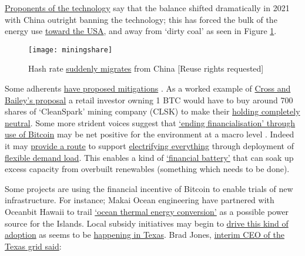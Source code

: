 \href{https://electricmoney.org/}{Proponents of the technology} say that the balance shifted dramatically in 2021 with China outright banning the technology; this has forced the bulk of the energy use \href{https://docs.google.com/spreadsheets/d/1E7489rM7Q62oXwk1f4NUlMvok9noAbpYfTynY2VTyww/edit#gid=0}{toward the USA}, and away from `dirty coal' as seen in Figure \ref{fig:miningshare}. 
\begin{figure}
  \centering
    \texttt{[image: miningshare]}
  \caption{Hash rate \href{https://ccaf.io/cbeci/ining_map}{suddenly migrates} from China [Reuse rights requested]}
  \label{fig:miningshare}
\end{figure}
Some adherents \href{https://docs.google.com/document/d/1N2N-5jY00cmteoY_puWI9oosM1foa4EQqsO1FFfIFR4/edit}{have proposed mitigations} \cite{cross2021greening}. As a worked example of \href{https://docs.google.com/spreadsheets/d/15e_a-D3x4fv3tglEzFmQ6TLQx0fZe6-iKO9Fc9SyISQ/edit#gid=0}{Cross and Bailey's proposal} a retail investor owning 1 BTC would have to buy around 700 shares of `CleanSpark' mining company (CLSK) to make their \href{https://docs.google.com/spreadsheets/d/1r32T8p_PHTP8S781u7PhPSwehLx2VcJTaJJKesMswD0/edit#gid=0}{holding completely neutral}.  Some more strident voices suggest that \href{https://medium.com/@magusperivallon/a-financial-hail-mary-for-the-climate-an-argument-for-bitcoin-adoption-9c58e707d0}{`ending financialisation' through use of Bitcoin} may be net positive for the environment at a macro level \cite{bitcoinisvenice}. Indeed it may \href{https://www.newsweek.com/bitcoin-mining-americas-most-misunderstood-industry-opinion-1669892}{provide a route} to support \href{https://mobile.twitter.com/DSBatten/status/1514072998881665027}{electrifying everything} through deployment of \href{https://lancium.com/solutions/}{flexible demand load}. This enables a kind of \href{https://medium.com/@theendoftheworldpartyparty/deep-bitcarbonization-c8f483716ff7}{`financial battery'} that can soak up excess capacity from overbuilt renewables (something which needs to be done). \par
Some projects are using the financial incentive of Bitcoin to enable trials of new infrastructure. For instance; Makai Ocean engineering have partnered with Oceanbit Hawaii to trail \href{https://en.wikipedia.org/wiki/Ocean_thermal_energy_conversion}{`ocean thermal energy conversion'} as a possible power source for the Islands. Local subsidy initiatives may begin to \href{https://fortune.com/2022/08/14/bitcoin-has-plunged-but-texas-miners-are-flush-with-profits-thanks-to-an-unusual-arrangement-the-state-is-paying-them-not-to-mine/}{drive this kind of adoption} as seems to be \href{https://braiins.com/blog/bitcoin-mining-the-grid-generators}{happening in Texas}\cite{griffith2021electrify, ercotimpact2021}. Brad Jones, \href{https://www.youtube.com/watch?v=gKnRfDeFgr0}{interim CEO of the Texas grid said}:\par
